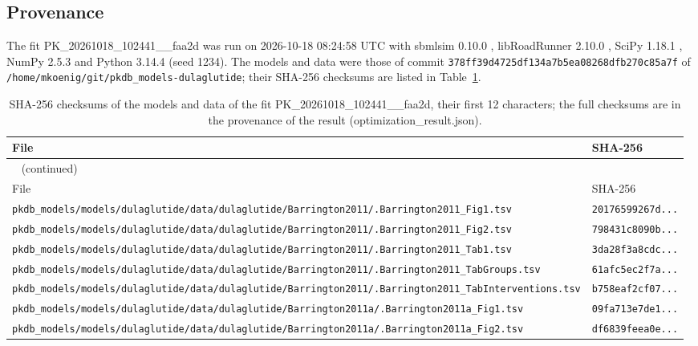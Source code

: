 \documentclass{article}
\begin{document}
\subsection{Provenance}

The fit PK\_20261018\_102441\_\_faa2d was run on 2026-10-18 08:24:58 UTC with sbmlsim 0.10.0 \cite{Koenig2026_sbmlsim}, libRoadRunner 2.10.0 \cite{Welsh2023}, SciPy 1.18.1 \cite{Virtanen2020}, NumPy 2.5.3 \cite{Harris2020} and Python 3.14.4 (seed 1234). The models and data were those of commit \texttt{378ff39d4725df134a7b5ea08268dfb270c85a7f} of \texttt{/home/mkoenig/git/pkdb\_models-dulaglutide}; their SHA-256 checksums are listed in Table~\ref{tab:checksums:PK_20261018_102441__faa2d}.

\begin{longtable}{ll}
\caption{SHA-256 checksums of the models and data of the fit PK\_20261018\_102441\_\_faa2d, their first 12 characters; the full checksums are in the provenance of the result (optimization\_result.json).}\label{tab:checksums:PK_20261018_102441__faa2d} \\
\toprule
File & SHA-256 \\
\midrule
\endfirsthead
\multicolumn{2}{l}{\small\tablename~\thetable{} (continued)} \\
\toprule
File & SHA-256 \\
\midrule
\endhead
\bottomrule
\endlastfoot
\texttt{pkdb\_models/models/dulaglutide/data/dulaglutide/Barrington2011/.Barrington2011\_Fig1.tsv} & \texttt{20176599267d...} \\
\texttt{pkdb\_models/models/dulaglutide/data/dulaglutide/Barrington2011/.Barrington2011\_Fig2.tsv} & \texttt{798431c8090b...} \\
\texttt{pkdb\_models/models/dulaglutide/data/dulaglutide/Barrington2011/.Barrington2011\_Tab1.tsv} & \texttt{3da28f3a8cdc...} \\
\texttt{pkdb\_models/models/dulaglutide/data/dulaglutide/Barrington2011/.Barrington2011\_TabGroups.tsv} & \texttt{61afc5ec2f7a...} \\
\texttt{pkdb\_models/models/dulaglutide/data/dulaglutide/Barrington2011/.Barrington2011\_TabInterventions.tsv} & \texttt{b758eaf2cf07...} \\
\texttt{pkdb\_models/models/dulaglutide/data/dulaglutide/Barrington2011a/.Barrington2011a\_Fig1.tsv} & \texttt{09fa713e7de1...} \\
\texttt{pkdb\_models/models/dulaglutide/data/dulaglutide/Barrington2011a/.Barrington2011a\_Fig2.tsv} & \texttt{df6839feea0e...} \\

\end{longtable}
\end{document}
